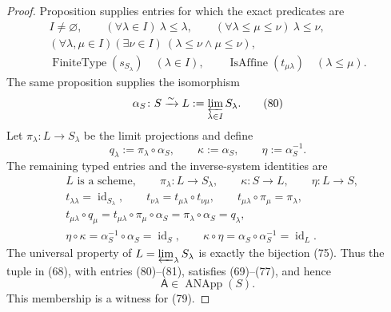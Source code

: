 \begin{proof}
  Proposition
  \cite[\href{https://stacks.math.columbia.edu/tag/01ZA}{Tag 01ZA}]
    {stacks-project}
  supplies entries for which the exact predicates are
  \[
  \begin{gathered}
    I\neq\varnothing,\qquad
    (\forall\lambda\in I)\ \lambda\leq\lambda,\qquad
    (\forall\lambda\leq\mu\leq\nu)\ \lambda\leq\nu,\\
    (\forall\lambda,\mu\in I)(\exists\nu\in I)\
      (\lambda\leq\nu\wedge\mu\leq\nu),\\
    \operatorname{FiniteType}(s_{S_\lambda})\quad(\lambda\in I),
    \qquad
    \operatorname{IsAffine}(t_{\mu\lambda})\quad(\lambda\leq\mu).
  \end{gathered}                                                     \tag{79a}
  \]
  The same proposition supplies the isomorphism
  \[
    \alpha_S\colon
      S\xrightarrow{\sim}
      L:=\varprojlim_{\lambda\in I}S_\lambda.                       \tag{80}
  \]
  Let \(\pi_\lambda\colon L\to S_\lambda\) be the limit projections and
  define
  \[
    q_\lambda:=\pi_\lambda\circ\alpha_S,\qquad
    \kappa:=\alpha_S,\qquad
    \eta:=\alpha_S^{-1}.                                            \tag{81}
  \]
  The remaining typed entries and the inverse-system identities are
  \begin{align}
    &L\text{ is a scheme},\qquad
      \pi_\lambda\colon L\to S_\lambda,\qquad
      \kappa\colon S\to L,\qquad\eta\colon L\to S,                  \tag{80a}\\
    &t_{\lambda\lambda}=\operatorname{id}_{S_\lambda},\qquad
    t_{\nu\lambda}=t_{\mu\lambda}\circ t_{\nu\mu},\qquad
    t_{\mu\lambda}\circ\pi_\mu=\pi_\lambda,                         \tag{82}\\
    &t_{\mu\lambda}\circ q_\mu
      =t_{\mu\lambda}\circ\pi_\mu\circ\alpha_S
      =\pi_\lambda\circ\alpha_S=q_\lambda,                          \tag{83}\\
    &\eta\circ\kappa
      =\alpha_S^{-1}\circ\alpha_S=\operatorname{id}_S,\qquad
    \kappa\circ\eta
      =\alpha_S\circ\alpha_S^{-1}=\operatorname{id}_L.              \tag{84}
  \end{align}
  The universal property of \(L=\varprojlim_\lambda S_\lambda\) is exactly
  the bijection (75).  Thus the tuple in (68), with entries (80)--(81),
  satisfies (69)--(77), and hence
  \[
    \mathsf A\in\operatorname{ANApp}(S).
  \]
  This membership is a witness for (79).
\end{proof}

